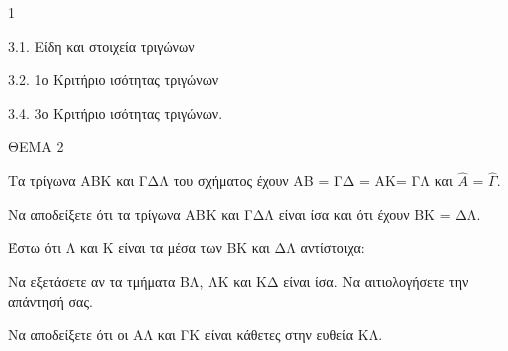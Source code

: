 \begin{ylh}{1}
    \item 3.1. Είδη και στοιχεία τριγώνων
    \item 3.2. 1ο Κριτήριο ισότητας τριγώνων
    \item 3.4. 3ο Κριτήριο ισότητας τριγώνων.
\end{ylh}

ΘΕΜΑ 2

Τα τρίγωνα ΑΒΚ και ΓΔΛ του σχήματος έχουν ΑΒ = ΓΔ = ΑΚ= ΓΛ και $\widehat{Α}$ = $\widehat{\Gamma}$.

\begin{alist}
\item Να αποδείξετε ότι τα τρίγωνα ΑΒΚ και ΓΔΛ είναι ίσα και ότι έχουν ΒΚ = ΔΛ.


\item Έστω ότι Λ και Κ είναι τα μέσα των ΒΚ και ΔΛ αντίστοιχα:

\begin{alist}
\item
  Να εξετάσετε αν τα τμήματα ΒΛ, ΛΚ και ΚΔ είναι ίσα. Να αιτιολογήσετε την απάντησή σας. 
\item
  Να αποδείξετε ότι οι ΑΛ και ΓΚ είναι κάθετες στην ευθεία ΚΛ.



\begin{center}
\end{center}
\end{alist}
\end{alist}
